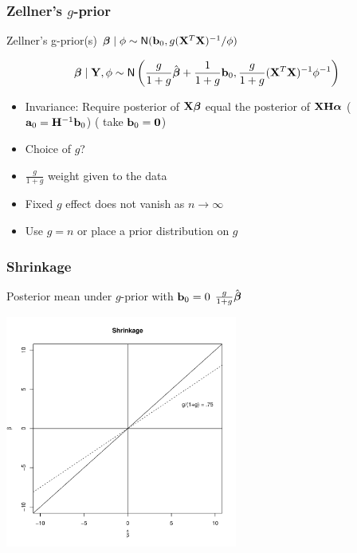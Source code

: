 \documentclass[handout]{beamer}
\begin{document}
\begin{frame}
  \frametitle{Zellner's $g$-prior}
Zellner's g-prior(s) $\boldsymbol{\beta} \mid \phi \sim \textsf{N}(\mathbf{b}_0, g
    (\mathbf{X}^T\mathbf{X})^{-1}/\phi)$ \pause

$$\boldsymbol{\beta} \mid \mathbf{Y}, \phi \sim \textsf{N}\left( \frac{g}{1 + g} \hat{\boldsymbol{\beta}} +  \frac{1}{1 + g}
\mathbf{b}_0, \frac{g}{1 + g} (\mathbf{X}^T\mathbf{X})^{-1} \phi^{-1} \right)$$ \pause

\begin{itemize}
\item Invariance: Require posterior of   $\mathbf{X} \boldsymbol{\beta}$  equal the posterior of $\mathbf{X} \mathbf{H} \boldsymbol{\alpha}$
\pause   ($\mathbf{a}_0 = \mathbf{H}^{-1} \mathbf{b}_0$)  ( take $\mathbf{b}_0 = \mathbf{0}$)

\item Choice of $g$?  \pause
\item $\frac{g}{1 + g}$  weight given to the data \pause
\item Fixed $g$ effect does not vanish as $n \to \infty$ 
\item Use $g = n$ or place a prior distribution on $g$
\end{itemize}


\end{frame}
\begin{frame}
  \frametitle{Shrinkage}
 Posterior mean under  $g$-prior  with $\mathbf{b}_0 = 0$
$\frac{g}{1 +g} \hat{\boldsymbol{\beta}} $

\centerline{\includegraphics[height=3in]{shrinkage}}
\end{frame}
\end{document}
